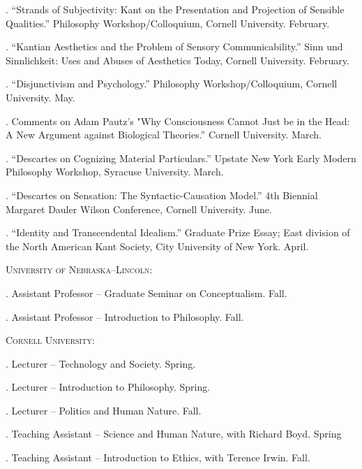 \documentclass[11pt]{article}
\begin{document}
. ``Strands of Subjectivity: Kant on the Presentation and Projection of Sensible 
Qualities.” Philosophy Workshop/Colloquium, Cornell University. February.

.  ``Kantian Aesthetics and the Problem of Sensory Communicability.” 
Sinn und Sinnlichkeit: Uses and Abuses of Aesthetics Today, Cornell University. February.

. ``Disjunctivism and Psychology.” Philosophy Workshop/Colloquium, Cornell University. May.

. Comments on Adam Pautz’s "Why Consciousness Cannot Just be in the Head: A 			New Argument against Biological Theories.” Cornell University. March.

. ``Descartes on Cognizing Material Particulars.” Upstate New York Early Modern 			Philosophy Workshop, Syracuse University. March.

. ``Descartes on Sensation: The Syntactic-Causation Model.” 4th Biennial 				Margaret Dauler Wilson Conference, Cornell University. June.

. ``Identity and Transcendental Idealism.” Graduate Prize Essay; East division of the North American Kant Society, City University of New York. April.


\bigskip


\medskip

\ind \textsc{University of Nebraska--Lincoln:}
\medskip

. Assistant Professor -- Graduate Seminar on Conceptualism. Fall. 

. Assistant Professor -- Introduction to Philosophy. Fall.

\medskip

\ind \textsc{Cornell University:}
\medskip

. Lecturer -- Technology and Society. Spring.

. Lecturer -- Introduction to Philosophy. Spring. 

. Lecturer -- Politics and Human Nature. Fall.

. Teaching Assistant -- Science and Human Nature, with Richard Boyd. Spring

. Teaching Assistant -- Introduction to Ethics, with Terence Irwin. Fall.
\end{document}
